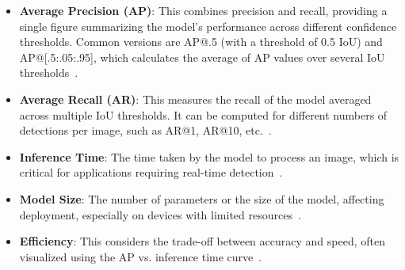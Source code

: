 \documentclass[12pt,oneside]{book} %
\begin{document}
\begin{itemize}
    \item \textbf{Average Precision (AP)}: This combines precision and recall, providing a single figure summarizing the model's performance across different confidence thresholds. Common versions are AP@.5 (with a threshold of 0.5 IoU) and AP@[.5:.05:.95], which calculates the average of AP values over several IoU thresholds~\cite{huggingface2023objectdetection}.
    \item \textbf{Average Recall (AR)}: This measures the recall of the model averaged across multiple IoU thresholds. It can be computed for different numbers of detections per image, such as AR@1, AR@10, etc.~\cite{huggingface2023objectdetection}.
    \item \textbf{Inference Time}: The time taken by the model to process an image, which is critical for applications requiring real-time detection~\cite{huggingface2023objectdetection}.
    \item \textbf{Model Size}: The number of parameters or the size of the model, affecting deployment, especially on devices with limited resources~\cite{huggingface2023objectdetection}.
    \item \textbf{Efficiency}: This considers the trade-off between accuracy and speed, often visualized using the AP vs. inference time curve~\cite{huggingface2023objectdetection}.
\end{itemize}
\end{document}
